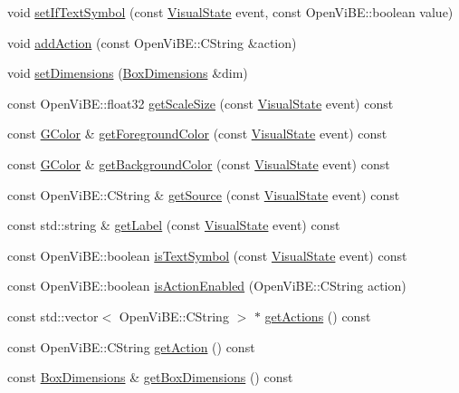 \begin{DoxyCompactItemize}
\item 
void \hyperlink{classOpenViBEApplications_1_1P300KeyDescriptor_a1b3ef9a728ecfba98a1e5a325cbc1808}{setIfTextSymbol} (const \hyperlink{ova__defines_8h_ac2575a0c79ceb4592555fa66f173dfc8}{VisualState} event, const OpenViBE::boolean value)
\item 
void \hyperlink{classOpenViBEApplications_1_1P300KeyDescriptor_a2aec946e2ae2722bfa25bf4ee3f6d605}{addAction} (const OpenViBE::CString \&action)
\item 
void \hyperlink{classOpenViBEApplications_1_1P300KeyDescriptor_a6e1c3a78a46a89092754c03987b7fe30}{setDimensions} (\hyperlink{structOpenViBEApplications_1_1__BoxDimensions}{BoxDimensions} \&dim)
\item 
const OpenViBE::float32 \hyperlink{classOpenViBEApplications_1_1P300KeyDescriptor_afd5e02415c4299ce027ecbf483e36c9e}{getScaleSize} (const \hyperlink{ova__defines_8h_ac2575a0c79ceb4592555fa66f173dfc8}{VisualState} event) const 
\item 
const \hyperlink{structOpenViBEApplications_1_1GColor}{GColor} \& \hyperlink{classOpenViBEApplications_1_1P300KeyDescriptor_a244510390ef780768b1da4d4f078e96c}{getForegroundColor} (const \hyperlink{ova__defines_8h_ac2575a0c79ceb4592555fa66f173dfc8}{VisualState} event) const 
\item 
const \hyperlink{structOpenViBEApplications_1_1GColor}{GColor} \& \hyperlink{classOpenViBEApplications_1_1P300KeyDescriptor_abec5d7f2e5c960be2a711fad1d811eb7}{getBackgroundColor} (const \hyperlink{ova__defines_8h_ac2575a0c79ceb4592555fa66f173dfc8}{VisualState} event) const 
\item 
const OpenViBE::CString \& \hyperlink{classOpenViBEApplications_1_1P300KeyDescriptor_a7e4ffab2eeb28a824b6d4ad82ddeed3d}{getSource} (const \hyperlink{ova__defines_8h_ac2575a0c79ceb4592555fa66f173dfc8}{VisualState} event) const 
\item 
const std::string \& \hyperlink{classOpenViBEApplications_1_1P300KeyDescriptor_af755dd92d1de3987ee3eced46fc43cbd}{getLabel} (const \hyperlink{ova__defines_8h_ac2575a0c79ceb4592555fa66f173dfc8}{VisualState} event) const 
\item 
const OpenViBE::boolean \hyperlink{classOpenViBEApplications_1_1P300KeyDescriptor_aa9607d3c1999cced08737af00542c1bd}{isTextSymbol} (const \hyperlink{ova__defines_8h_ac2575a0c79ceb4592555fa66f173dfc8}{VisualState} event) const 
\item 
const OpenViBE::boolean \hyperlink{classOpenViBEApplications_1_1P300KeyDescriptor_a7413690f49058881e27971ca1e543aba}{isActionEnabled} (OpenViBE::CString action)
\item 
const std::vector$<$ OpenViBE::CString $>$ $\ast$ \hyperlink{classOpenViBEApplications_1_1P300KeyDescriptor_a7eac14cc61e33e1c89accaffb0f69222}{getActions} () const 
\item 
const OpenViBE::CString \hyperlink{classOpenViBEApplications_1_1P300KeyDescriptor_a59daeed671e0803259b70ed3286d89c0}{getAction} () const 
\item 
const \hyperlink{structOpenViBEApplications_1_1__BoxDimensions}{BoxDimensions} \& \hyperlink{classOpenViBEApplications_1_1P300KeyDescriptor_a540008cda601508e5148f6d71791593a}{getBoxDimensions} () const 
\end{DoxyCompactItemize}

